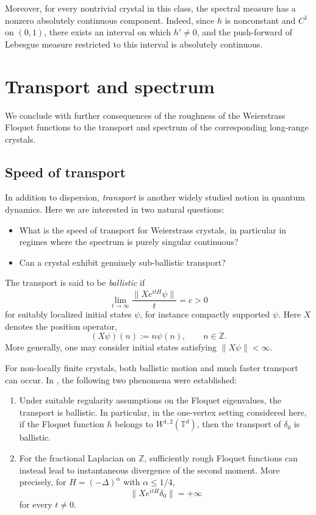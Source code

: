 \documentclass[11pt]{amsart}
\theoremstyle{plain}
\theoremstyle{definition}
\numberwithin{equation}{section}
\begin{document}
Moreover, for every nontrivial crystal in this class, the spectral measure has a nonzero absolutely continuous component. Indeed, since $h$ is nonconstant and $C^1$ on $(0,1)$, there exists an interval on which $h'\neq0$, and the push-forward of Lebesgue measure restricted to this interval is absolutely continuous.

\section{Transport and spectrum} \label{sec:further}

We conclude with further consequences of the roughness of the Weierstrass Floquet functions to the transport and spectrum of the corresponding long-range crystals.

\subsection{Speed of transport}

In addition to dispersion, \textit{transport} is another widely studied notion in quantum dynamics. Here we are interested in two natural questions:
\begin{itemize}
\item What is the speed of transport for Weierstrass crystals, in particular in regimes where the spectrum is purely singular continuous?
\item Can a crystal exhibit genuinely sub-ballistic transport?
\end{itemize}
The transport is said to be \textit{ballistic} if
$$
\lim_{t\to\infty}\frac{\|Xe^{itH}\psi\|}{t}=c>0
$$
for suitably localized initial states $\psi$, for instance compactly supported $\psi$. Here $X$ denotes the position operator,
$$
(X\psi)(n):=n\psi(n),\qquad n\in\mathbb Z.
$$
More generally, one may consider initial states satisfying $\|X\psi\|<\infty$.

For non-locally finite crystals, both ballistic motion and much faster transport can occur. In \cite{KernerPostSabriTaufer}, the following two phenomena were established:
\begin{enumerate}
\item Under suitable regularity assumptions on the Floquet eigenvalues, the transport is ballistic. In particular, in the one-vertex setting considered here, if the Floquet function $h$ belongs to $W^{1,2}(\mathbb T^d)$, then the transport of $\delta_0$ is ballistic.
\item For the fractional Laplacian on $\mathbb Z$, sufficiently rough Floquet functions can instead lead to instantaneous divergence of the second moment. More precisely, for $H=(-\Delta)^\alpha$ with $\alpha\leq1/4$,
$$
\|Xe^{itH}\delta_0\|=+\infty
$$
for every $t\neq0$.
\end{enumerate}
\end{document}

